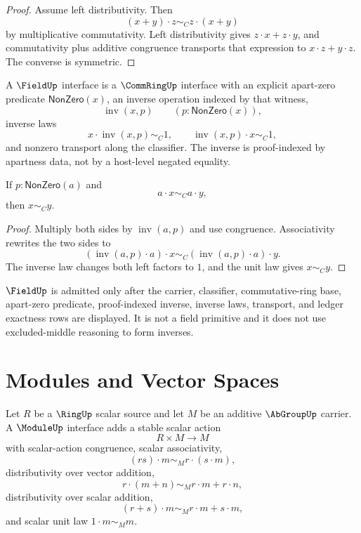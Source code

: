 \begin{proof}
Assume left distributivity.  Then
$$
(x+y)\cdot z\sim_C z\cdot(x+y)
$$
by multiplicative commutativity.  Left distributivity gives
$z\cdot x+z\cdot y$, and commutativity plus additive congruence transports
that expression to $x\cdot z+y\cdot z$.  The converse is symmetric.
\end{proof}

\begin{definition}
\label{def:algebra-spine-field}
A $\FieldUp$ interface is a $\CommRingUp$ interface with an explicit
apart-zero predicate $\mathsf{NonZero}(x)$, an inverse operation indexed by
that witness,
$$
\operatorname{inv}(x,p)
\qquad
(p:\mathsf{NonZero}(x)),
$$
inverse laws
$$
x\cdot\operatorname{inv}(x,p)\sim_C1,
\qquad
\operatorname{inv}(x,p)\cdot x\sim_C1,
$$
and nonzero transport along the classifier.  The inverse is proof-indexed by
apartness data, not by a host-level negated equality.
\end{definition}

\begin{theorem}
\label{thm:algebra-spine-field-nonzero-cancellation}
If $p:\mathsf{NonZero}(a)$ and
$$
a\cdot x\sim_Ca\cdot y,
$$
then $x\sim_Cy$.
\end{theorem}

\begin{proof}
Multiply both sides by $\operatorname{inv}(a,p)$ and use congruence.
Associativity rewrites the two sides to
$$
(\operatorname{inv}(a,p)\cdot a)\cdot x
\sim_C
(\operatorname{inv}(a,p)\cdot a)\cdot y.
$$
The inverse law changes both left factors to $1$, and the unit law gives
$x\sim_Cy$.
\end{proof}

\begin{principle}
\label{prin:algebra-spine-field-boundary}
$\FieldUp$ is admitted only after the carrier, classifier, commutative-ring
base, apart-zero predicate, proof-indexed inverse, inverse laws, transport,
and ledger exactness rows are displayed.  It is not a field primitive and it
does not use excluded-middle reasoning to form inverses.
\end{principle}

\section{Modules and Vector Spaces}
\label{sec:algebra-spine-module-vecspace}

\begin{definition}
\label{def:algebra-spine-module}
Let $R$ be a $\RingUp$ scalar source and let $M$ be an additive
$\AbGroupUp$ carrier.  A $\ModuleUp$ interface adds a stable scalar action
$$
R\times M\to M
$$
with scalar-action congruence, scalar associativity,
$$
(rs)\cdot m\sim_M r\cdot(s\cdot m),
$$
distributivity over vector addition,
$$
r\cdot(m+n)\sim_M r\cdot m+r\cdot n,
$$
distributivity over scalar addition,
$$
(r+s)\cdot m\sim_M r\cdot m+s\cdot m,
$$
and scalar unit law $1\cdot m\sim_Mm$.
\end{definition}

